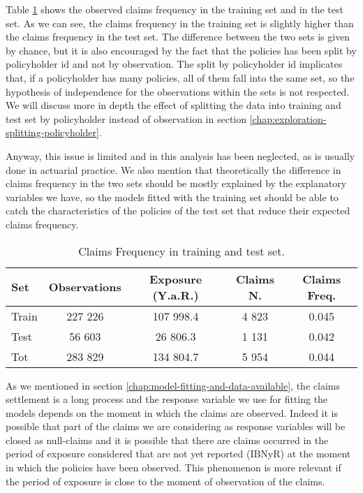 \documentclass[a4paper, twoside, openright, 12pt]{report}
\theoremstyle{definition}
\theoremstyle{definition}
\theoremstyle{definition}
\theoremstyle{remark}
\begin{document}
Table \ref{tab:freq-sin-train-test} shows the observed claims frequency in the training set and in the test set. As we can see, the claims frequency in the training set is slightly higher than the claims frequency in the test set. The difference between the two sets is given by chance, but it is also encouraged by the fact that the policies has been split by policyholder id and not by observation. The split by policyholder id implicates that, if a policyholder has many policies, all of them fall into the same set, so the hypothesis of independence for the observations within the sets is not respected. We will discuss more in depth the effect of splitting the data into training and test set by policyholder instead of observation in section \ref{chap:exploration-splitting-policyholder}.

Anyway, this issue is limited and in this analysis has been neglected, as is usually done in actuarial practice. We also mention that theoretically the difference in claims frequency in the two sets should be mostly explained by the explanatory variables we have, so the models fitted with the training set should be able to catch the characteristics of the policies of the test set that reduce their expected claims frequency.

\begin{table}[!h]

\caption{\label{tab:freq-sin-train-test}Claims Frequency in training and test set.}
\centering
\begin{tabular}[t]{lcccc}
\toprule
\textbf{Set} & \textbf{Observations} & \textbf{Exposure (Y.a.R.)} & \textbf{Claims N.} & \textbf{Claims Freq.}\\
\midrule[\heavyrulewidth]
Train & 227 226 & 107 998.4 & 4 823 & 0.045\\
Test & 56 603 & 26 806.3 & 1 131 & 0.042\\
\midrule
Tot & 283 829 & 134 804.7 & 5 954 & 0.044\\
\bottomrule
\end{tabular}
\end{table}

As we mentioned in section \ref{chap:model-fitting-and-data-available}, the claims settlement is a long process and the response variable we use for fitting the models depends on the moment in which the claims are observed. Indeed it is possible that part of the claims we are considering as response variables will be closed as null-claims and it is possible that there are claims occurred in the period of exposure considered that are not yet reported (IBNyR) at the moment in which the policies have been observed. This phenomenon is more relevant if the period of exposure is close to the moment of observation of the claims.
\end{document}
